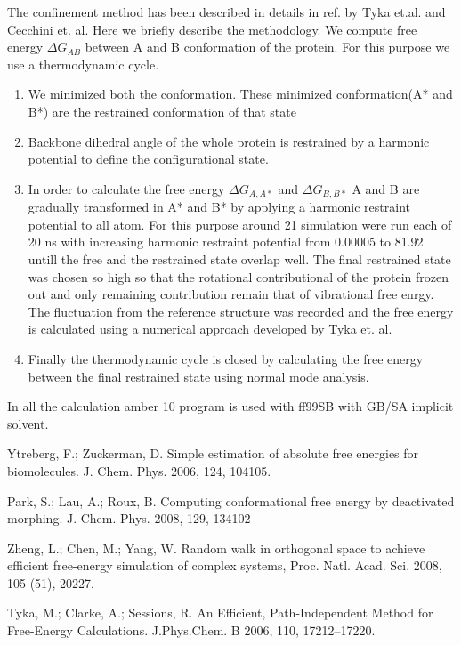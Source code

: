 \documentclass[12pt]{article}
\begin{document}
The confinement method has been described in details in ref. by Tyka et.al. and Cecchini et. al.
Here we briefly describe the methodology.  We compute free energy $\Delta G_{AB}$ between A and B
conformation of the protein. For this purpose we use a thermodynamic cycle.

\begin{enumerate}

\item  We minimized both the conformation. These minimized conformation(A* and B*) are the
    restrained conformation of that state

\item Backbone dihedral angle of the whole protein is restrained by a harmonic potential to define
    the configurational state.

\item  In order to calculate the free energy $\Delta G_{A,A*}$ and  $\Delta G_{B,B*}$ A and B are
    gradually transformed in A* and B* by applying a harmonic restraint potential to all atom. For
    this purpose around 21 simulation were run each of 20 ns with increasing harmonic restraint
    potential from 0.00005 to 81.92 untill the free and the restrained state overlap well. The final
    restrained state was chosen so high so that the rotational contributional of the protein frozen
    out and only remaining contribution remain that of vibrational free enrgy. The fluctuation from
    the reference structure was recorded and the free energy is calculated using a numerical
    approach developed by Tyka et. al.

\item  Finally the thermodynamic cycle is closed by calculating the free energy between the final
    restrained state using normal mode analysis.

\end{enumerate}

In all the calculation amber 10 program is used with ff99SB with GB/SA implicit solvent.





Ytreberg, F.; Zuckerman, D. Simple estimation of absolute free energies for biomolecules. J. Chem. Phys. 2006, 124, 104105.

Park, S.; Lau, A.; Roux, B. Computing conformational free energy by deactivated morphing. J. Chem. Phys. 2008, 129, 134102

Zheng, L.; Chen, M.; Yang, W. Random walk in orthogonal space to achieve efficient free-energy simulation of complex systems, Proc. Natl. Acad. Sci. 2008, 105 (51), 20227.

Tyka, M.; Clarke, A.; Sessions, R. An Efficient, Path-Independent Method for Free-Energy Calculations. J.Phys.Chem. B 2006, 110, 17212–17220.
\end{document}
